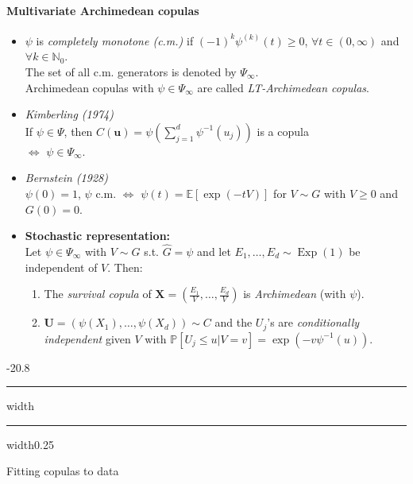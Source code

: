 \documentclass[a4paper,landscape,8pt,fleqn]{scrartcl}
\makeatletter
\renewcommand{\emph}[1]{\textbf{#1}}
\renewcommand{\subsection}{\@startsection{subsection}{1}{0mm}%
{-2\baselineskip}{0.8\baselineskip}%
{\hrule depth 0.2pt width\columnwidth\hrule depth0.75pt
width0.25\columnwidth\vspace*{1.2em}\large\bfseries}}
\DeclareMathOperator{\Exp}{Exp}				%
\makeatother
\begin{document}
\begin{multicols*}{3}
\paragraph{Multivariate Archimedean copulas}
\begin{itemize}
\item $\psi$ is \textit{completely monotone (c.m.)} if $(-1)^k \psi^{(k)}(t) \geq 0$, $\forall t \in (0, \infty)$ and $\forall k \in \mathbb{N}_0$. \\
The set of all c.m. generators is denoted by $\Psi_\infty$. \\
Archimedean copulas with $\psi \in \Psi_\infty$ are called \textit{LT-Archimedean copulas}.
\item \textit{Kimberling (1974)} \\
If $\psi \in \Psi$, then $C(\bm u) = \psi \left( \sum_{j=1}^d \psi^{-1}(u_j) \right)$ is a copula \\
$\iff$ $\psi \in \Psi_\infty$.
\item \textit{Bernstein (1928)} \\
$\psi(0) = 1$, $\psi$ c.m. $\iff$ $\psi(t) = \mathbb{E}[\exp(-t V)]$ for $V \sim G$ with $V \geq 0$ and $G(0) = 0$.
\item \emph{Stochastic representation:} \\
Let $\psi \in \Psi_\infty$ with $V \sim G$ s.t. $\hat G = \psi$ and let $E_1, \ldots, E_d \sim \Exp(1)$ be independent of $V$. Then:
\begin{enumerate}
\item The \textit{survival copula} of $\bm X = (\frac{E_1}{V}, \ldots, \frac{E_d}{V})$ is \textit{Archimedean} (with $\psi$).
\item $\bm U = (\psi(X_1), \ldots, \psi(X_d)) \sim C$ and the $U_j$'s are \textit{conditionally independent} given $V$ with $\mathbb{P}[U_j \leq u | V = v] = \exp(-v \psi^{-1}(u))$.
\end{enumerate}
\end{itemize}

\subsection{Fitting copulas to data}


\end{multicols*}
\end{document}
